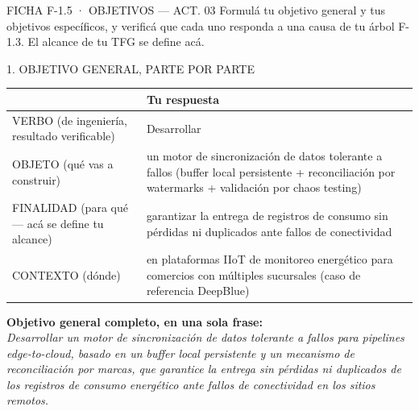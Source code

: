 \documentclass[11pt,a4paper]{article}
\newcommand{\tblhead}{\rowcolor{gris800}}
\begin{document}
\begin{seccion}{\faBullseye}{FICHA F-1.5 · OBJETIVOS --- ACT. 03}
{\small
Formulá tu objetivo general y tus objetivos específicos, y verificá que cada uno responda a una causa de tu árbol F-1.3. El alcance de tu TFG se define acá.
}

\begin{seccion}{\faCog}{1. OBJETIVO GENERAL, PARTE POR PARTE}
\renewcommand{\arraystretch}{1.3}
\begin{tabularx}{\linewidth}{>{\raggedright\arraybackslash}p{4.4cm} X}
  \toprule
  \tblhead {\color{white}\bfseries Pieza} & {\color{white}\bfseries Tu respuesta} \\
  \midrule
  VERBO (de ingeniería, resultado verificable) & Desarrollar \\
  OBJETO (qué vas a construir) & un motor de sincronización de datos tolerante a fallos (buffer local persistente + reconciliación por watermarks + validación por chaos testing) \\
  FINALIDAD (para qué --- acá se define tu alcance) & garantizar la entrega de registros de consumo sin pérdidas ni duplicados ante fallos de conectividad \\
  CONTEXTO (dónde) & en plataformas IIoT de monitoreo energético para comercios con múltiples sucursales (caso de referencia DeepBlue) \\
  \bottomrule
\end{tabularx}
\vspace{6pt}
\textbf{Objetivo general completo, en una sola frase:}\\[2pt]
{\small\emph{Desarrollar un motor de sincronización de datos tolerante a fallos para pipelines edge-to-cloud, basado en un buffer local persistente y un mecanismo de reconciliación por marcas, que garantice la entrega sin pérdidas ni duplicados de los registros de consumo energético ante fallos de conectividad en los sitios remotos.}}
\end{seccion}


\end{seccion}
\end{document}

